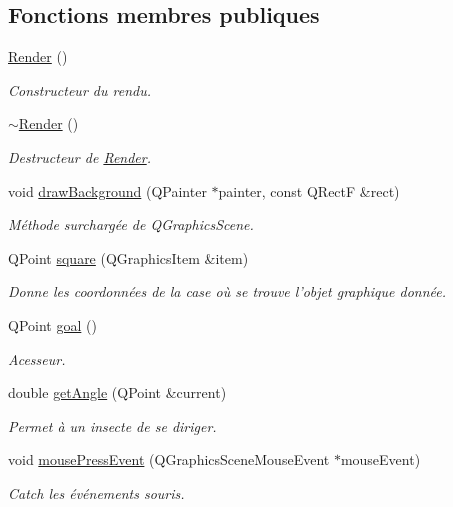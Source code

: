 \subsection*{Fonctions membres publiques}
\begin{DoxyCompactItemize}
\item 
\hyperlink{classRender_a8610cc11739ef679b5935dd819021351}{Render} ()
\begin{DoxyCompactList}\small\item\em Constructeur du rendu. \end{DoxyCompactList}\item 
\hyperlink{classRender_ab0f4b917605cb15902f8d045a4197faf}{$\sim$Render} ()
\begin{DoxyCompactList}\small\item\em Destructeur de \hyperlink{classRender}{Render}. \end{DoxyCompactList}\item 
void \hyperlink{classRender_aae10ca06c2755038752a2a007727f0ca}{drawBackground} (QPainter $\ast$painter, const QRectF \&rect)
\begin{DoxyCompactList}\small\item\em Méthode surchargée de QGraphicsScene. \end{DoxyCompactList}\item 
QPoint \hyperlink{classRender_a1291eebbb0647502fc90d058bc22e7a3}{square} (QGraphicsItem \&item)
\begin{DoxyCompactList}\small\item\em Donne les coordonnées de la case où se trouve l'objet graphique donnée. \end{DoxyCompactList}\item 
QPoint \hyperlink{classRender_afd1f727c1514ca01ad1cefbf4992497b}{goal} ()
\begin{DoxyCompactList}\small\item\em Acesseur. \end{DoxyCompactList}\item 
double \hyperlink{classRender_a696f385b556f15a7420293a055734e4d}{getAngle} (QPoint \&current)
\begin{DoxyCompactList}\small\item\em Permet à un insecte de se diriger. \end{DoxyCompactList}\item 
void \hyperlink{classRender_a899ce19de8a01bb4bc01653cd8761357}{mousePressEvent} (QGraphicsSceneMouseEvent $\ast$mouseEvent)
\begin{DoxyCompactList}\small\item\em Catch les événements souris. \end{DoxyCompactList}\item 

\end{DoxyCompactItemize}
